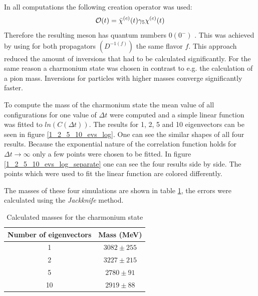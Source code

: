     \noindent
    In all computations the following creation operator was used:
    \begin{equation}
        \mathcal{O}(t) = \bar{\chi}^{(c)}(t)\gamma_5\chi^{(c)}(t)
    \end{equation}
    Therefore the resulting meson has quantum numbers $0(0^-)$ \cite{masses_of_D_mesons}. This was achieved by using for both propagators $(D^{-1(f)})$ the same flavor $f$. This approach reduced the amount of inversions that had to be calculated significantly. For the same reason a charmonium state was chosen in contrast to e.g. the calculation of a pion mass. Inversions for particles with higher masses converge significantly faster.
    
    To compute the mass of the charmonium state the mean value of all configurations for one value of $\Delta t$ were computed and a simple linear function was fitted to $ln(C(\Delta t))$. The results for 1, 2, 5 and 10 eigenvectors can be seen in figure \ref{1_2_5_10_evs_log}. One can see the similar shapes of all four results. Because the exponential nature of the correlation function holds for $\Delta t \rightarrow \infty$ only a few points were chosen to be fitted. In figure \ref{1_2_5_10_evs_log_separate} one can see the four results side by side. The points which were used to fit the linear function are colored differently.
    
    The masses of these four simulations are shown in table \ref{meson_masses}, the errors were calculated using the \textit{Jackknife} \cite{jackknife} method.
    \begin{table}[h]
            \centering
            \begin{tabular}{|c|c|}
            \hline
            \multicolumn{1}{|c|}{Number of eigenvectors} & \multicolumn{1}{c|}{Mass (MeV)} \\ \hline
             1 & $3082 \pm 255$\\
             2 & $3227 \pm 215$\\
             5 & $2780 \pm 91$\\
             10& $2919 \pm 88$\\
              \hline
            \end{tabular}
            \caption{Calculated masses for the charmonium state}
            \label{meson_masses}
        \end{table}
    
    
    
